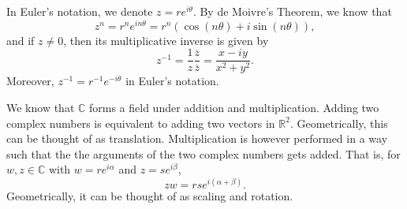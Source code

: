 \documentclass[a4paper, openany]{memoir}
\theoremstyle{definition}
\theoremstyle{plain}
\newtheorem{lemma}[definition]{Lemma}
\newtheorem{proposition}[definition]{Proposition}
\begin{document}
In Euler's notation, we denote $z = re^{i \theta}$. By de Moivre's Theorem, we know that
\[z^n = r^n e^{in \theta} = r^n (\cos (n \theta) + i \sin (n \theta)),\]
and if $z \neq 0$, then its multiplicative inverse is given by
\[z^{-1} = \frac{1}{z} \frac{\overline{z}}{\overline{z}} = \frac{x - iy}{x^2 + y^2}.\]
Moreover, $z^{-1} = r^{-1} e^{-i \theta}$ in Euler's notation.

We know that $\mathbb{C}$ forms a field under addition and multiplication. Adding two complex numbers is equivalent to adding two vectors in $\mathbb{R}^2$. Geometrically, this can be thought of as translation. Multiplication is however performed in a way such that the the arguments of the two complex numbers gets added. That is, for $w, z \in \mathbb{C}$ with $w = re^{i \alpha}$ and $z = se^{i \beta}$,
\[zw = rse^{i (\alpha + \beta)}.\]
Geometrically, it can be thought of as scaling and rotation.

\newpage
\end{document}
